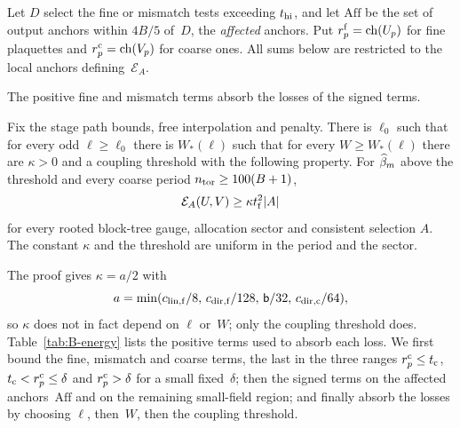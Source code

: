 Let $D$ select the fine or mismatch tests exceeding $t_{\rm hi}$, and let $\mathrm{Aff}$ be the set of output anchors within $4B/5$ of~$D$, the \emph{affected} anchors. Put $r^{\rm f}_p=\operatorname{ch}(U_p)$ for fine plaquettes and $r^{\rm c}_p=\operatorname{ch}(V_p)$ for coarse ones. All sums below are restricted to the local anchors defining~$\mathcal E_A$.

The positive fine and mismatch terms absorb the losses of the signed terms.
\begin{lemma}\label{lem:B-D1}
Fix the stage path bounds, free interpolation and penalty. There is $\ell_0$ such that for every odd $\ell\ge\ell_0$ there is $W_*(\ell)$ such that for every $W\ge W_*(\ell)$ there are $\kappa>0$ and a coupling threshold with the following property. For $\widehat{\beta}_m$ above the threshold and every coarse period $n_{\rm tor}\ge100(B+1)$,
\begin{equation*}
\mathcal E_A(U,V)\ge\kappa t_{\rm f}^2|A|
\end{equation*}
for every rooted block-tree gauge, allocation sector and consistent selection $A$. The constant $\kappa$ and the threshold are uniform in the period and the sector.
\end{lemma}
The proof gives $\kappa=a/2$ with
\begin{equation*}
a=\min(c_{{\rm lin},{\rm f}}/8,\,c_{{\rm dir},{\rm f}}/128,\,\mathsf{b}/32,\,c_{{\rm dir},{\rm c}}/64),
\end{equation*}
so $\kappa$ does not in fact depend on $\ell$ or~$W$; only the coupling threshold does. Table~\ref{tab:B-energy} lists the positive terms used to absorb each loss. We first bound the fine, mismatch and coarse terms, the last in the three ranges $r^{\rm c}_p\le t_{\rm c}$, $t_{\rm c}<r^{\rm c}_p\le\delta$ and $r^{\rm c}_p>\delta$ for a small fixed~$\delta$; then the signed terms on the affected anchors~$\mathrm{Aff}$ and on the remaining small-field region; and finally absorb the losses by choosing $\ell$, then~$W$, then the coupling threshold.

